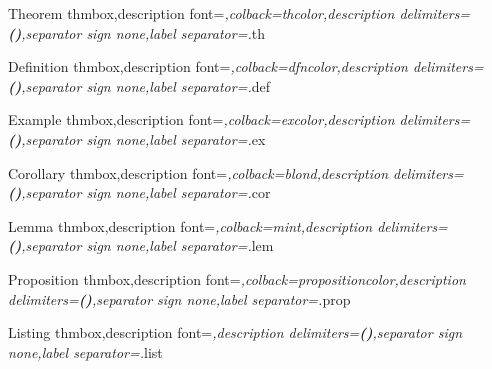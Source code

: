{Theorem}
{thmbox,description font=\itshape,colback=thcolor,description delimiters={{\normalfont\bfseries(}}{\normalfont\bfseries)},separator sign none,label separator=.}{th} %

{Definition}
{thmbox,description font=\itshape,colback=dfncolor,description delimiters={{\normalfont\bfseries(}}{\normalfont\bfseries)},separator sign none,label separator=.}{def}

{Example}
{thmbox,description font=\itshape,colback=excolor,description delimiters={{\normalfont\bfseries(}}{\normalfont\bfseries)},separator sign none,label separator=.}{ex}

{Corollary}
{thmbox,description font=\itshape,colback=blond,description delimiters={{\normalfont\bfseries(}}{\normalfont\bfseries)},separator sign none,label separator=.}{cor}

{Lemma}
{thmbox,description font=\itshape,colback=mint,description delimiters={{\normalfont\bfseries(}}{\normalfont\bfseries)},separator sign none,label separator=.}{lem}

{Proposition}
{thmbox,description font=\itshape,colback=propositioncolor,description delimiters={{\normalfont\bfseries(}}{\normalfont\bfseries)},separator sign none,label separator=.}{prop}

{Listing}
{thmbox,description font=\itshape,description delimiters={{\normalfont\bfseries(}}{\normalfont\bfseries)},separator sign none,label separator=.}{list}


\lstset{style=mypython}

